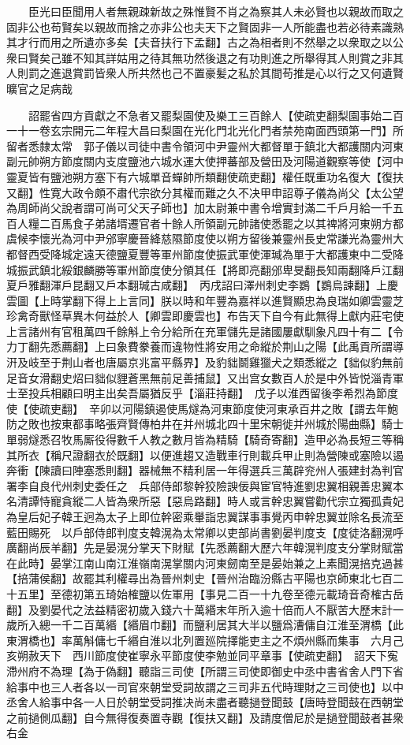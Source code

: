 　　臣光曰臣聞用人者無親疎新故之殊惟賢不肖之為察其人未必賢也以親故而取之固非公也苟賢矣以親故而捨之亦非公也夫天下之賢固非一人所能盡也若必待素識熟其才行而用之所遺亦多矣【夫音扶行下孟翻】古之為相者則不然舉之以衆取之以公衆曰賢矣己雖不知其詳姑用之待其無功然後退之有功則進之所舉得其人則賞之非其人則罰之進退賞罰皆衆人所共然也己不置豪髪之私於其間苟推是心以行之又何遺賢曠官之足病哉

　　詔罷省四方貢獻之不急者又罷梨園使及樂工三百餘人【使疏吏翻梨園事始二百一十一卷玄宗開元二年程大昌曰梨園在光化門北光化門者禁苑南面西頭第一門】所留者悉隸太常　郭子儀以司徒中書令領河中尹靈州大都督單于鎮北大都護關内河東副元帥朔方節度關内支度鹽池六城水運大使押蕃部及營田及河陽道觀察等使【河中靈夏皆有鹽池朔方塞下有六城單音蟬帥所類翻使疏吏翻】權任既重功名復大【復扶又翻】性寛大政令頗不肅代宗欲分其權而難之久不决甲申詔尊子儀為尚父【太公望為周師尚父說者謂可尚可父天子師也】加太尉兼中書令增實封滿二千戶月給一千五百人糧二百馬食子弟諸壻遷官者十餘人所領副元帥諸使悉罷之以其禆將河東朔方都虞候李懷光為河中尹邠寧慶晉絳慈隰節度使以朔方留後兼靈州長史常謙光為靈州大都督西受降城定遠天德鹽夏豐等軍州節度使振武軍使渾瑊為單于大都護東中二受降城振武鎮北綏銀麟勝等軍州節度使分領其任【將即亮翻邠卑旻翻長知兩翻降戶江翻夏戶雅翻渾戶昆翻又戶本翻瑊古咸翻】　丙戌詔曰澤州刺史李鷃【鷃烏諫翻】上慶雲圖【上時掌翻下得上上言同】朕以時和年豐為嘉祥以進賢顯忠為良瑞如卿雲靈芝珍禽奇獸怪草異木何益於人【卿雲即慶雲也】布告天下自今有此無得上獻内莊宅使上言諸州有官租萬四千餘斛上令分給所在充軍儲先是諸國屢獻馴象凡四十有二【令力丁翻先悉薦翻】上曰象費豢養而違物性將安用之命縱於荆山之陽【此禹貢所謂導汧及岐至于荆山者也唐屬京兆富平縣界】及豹貀鬬雞獵犬之類悉縱之【貀似豹無前足音女滑翻史炤曰貀似貍蒼黑無前足善捕鼠】又出宫女數百人於是中外皆悦淄青軍士至投兵相顧曰明主出矣吾屬猶反乎【淄莊持翻】　戊子以淮西留後李希烈為節度使【使疏吏翻】　辛卯以河陽鎮遏使馬燧為河東節度使河東承百井之敗【謂去年鮑防之敗也按東都事略張齊賢傳柏井在并州城北四十里宋朝徙并州城於陽曲縣】騎士單弱燧悉召牧馬厮役得數千人教之數月皆為精騎【騎奇寄翻】造甲必為長短三等稱其所衣【稱尺證翻衣於既翻】以便進趨又造戰車行則載兵甲止則為營陳或塞險以遏奔衝【陳讀曰陣塞悉則翻】器械無不精利居一年得選兵三萬辟兖州人張建封為判官署李自良代州刺史委任之　兵部侍郎黎幹狡險諛佞與宦官特進劉忠翼相親善忠翼本名清譚恃寵貪縱二人皆為衆所惡【惡烏路翻】時人或言幹忠翼嘗勸代宗立獨孤貴妃為皇后妃子韓王迥為太子上即位幹密乘轝詣忠翼謀事事覺丙申幹忠翼並除名長流至藍田賜死　以戶部侍郎判度支韓滉為太常卿以吏部尚書劉晏判度支【度徒洛翻滉呼廣翻尚辰羊翻】先是晏滉分掌天下財賦【先悉薦翻大歷六年韓滉判度支分掌財賦當在此時】晏掌江南山南江淮嶺南滉掌關内河東劒南至是晏始兼之上素聞滉掊克過甚【掊蒲侯翻】故罷其利權尋出為晉州刺史【晉州治臨汾縣古平陽也京師東北七百二十五里】至德初第五琦始榷鹽以佐軍用【事見二百一十九卷至德元載琦音奇榷古岳翻】及劉晏代之法益精密初歲入錢六十萬緡末年所入逾十倍而人不厭苦大歷末計一歲所入總一千二百萬緡【緡眉巾翻】而鹽利居其大半以鹽爲漕傭自江淮至渭橋【此東渭橋也】率萬斛傭七千緡自淮以北列置廵院擇能吏主之不煩州縣而集事　六月己亥朔赦天下　西川節度使崔寧永平節度使李勉並同平章事【使疏吏翻】　詔天下寃滯州府不為理【為于偽翻】聽詣三司使【所謂三司使即御史中丞中書省舍人門下省給事中也三人者各以一司官來朝堂受詞故謂之三司非五代時理財之三司使也】以中丞舍人給事中各一人日於朝堂受詞推决尚未盡者聽撾登聞鼓【唐時登聞鼓在西朝堂之前撾側瓜翻】自今無得復奏置寺觀【復扶又翻】及請度僧尼於是撾登聞鼓者甚衆右金